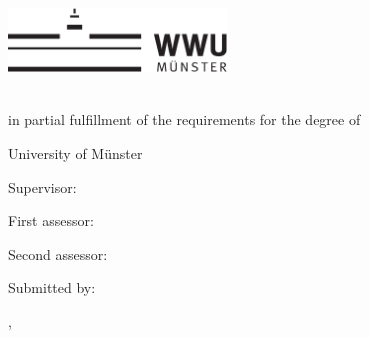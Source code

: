 \thispagestyle{empty}

\begin{center}
    \includegraphics[height=1.7cm]{logos/wwu.pdf}
    \hfill

    \par
    \vspace*{8ex}
    {
        \linespread{0.9}
        \LARGE
        \printtitle
        \par
    }
    \normalsize
    \vspace*{8ex}
    \large
    \textsc{\printtype}\\
    \normalsize
    in partial fulfillment of the requirements for the degree of\\
    \large
    \textsc{\printdegree}
    \par
    \normalsize
    \vspace*{6ex}
    University of Münster\\
    \printinstitute
\end{center}

\par
\vspace*{6ex}
Supervisor:\\
\large
\textit{\printsupervisor}

\par
\normalsize
\vspace*{2ex}
First assessor:\\
\large
\textit{\printfirstassessor}

\par
\normalsize
\vspace*{2ex}
Second assessor:\\
\large
\textit{\printsecondassessor}

\par
\normalsize
\vspace*{2ex}
Submitted by:\\
\large
\textit{\printname}

\par
\normalsize
\vspace*{4ex}
\printcity, \makeatletter
\monthname
\makeatother~\the\year
